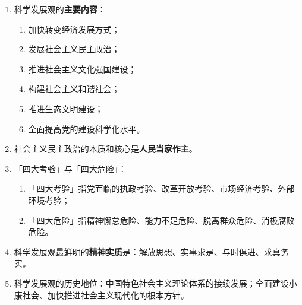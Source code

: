 \documentclass[UTF8]{ctexart}
\newcommand\Emph[2]{\colorbox{c#1-light}{\textcolor{c#1-emph}{\textbf{#2}}}}
\begin{document}
\begin{enumerate}[start=12]
  \item 科学发展观的\Emph{8}{主要内容}：
  \begin{enumerate}[label={\roman{enumii})}, start=1]
    \item 加快转变经济发展方式；
    \item 发展社会主义民主政治；
    \item 推进社会主义文化强国建设；
    \item 构建社会主义和谐社会；
    \item 推进生态文明建设；
    \item 全面提高党的建设科学化水平。
  \end{enumerate}
  \item 社会主义民主政治的本质和核心是\Emph{8}{人民当家作主}。
  \item 「四大考验」与「四大危险」：
  \begin{enumerate}[label={\roman{enumii})}, start=1]
    \item 「四大考验」指党面临的执政考验、改革开放考验、市场经济考验、外部环境考验；
    \item 「四大危险」指精神懈怠危险、能力不足危险、脱离群众危险、消极腐败危险。
  \end{enumerate}
  \item 科学发展观最鲜明的\Emph{8}{精神实质}是：解放思想、实事求是、与时俱进、求真务实。
  \item 科学发展观的历史地位：中国特色社会主义理论体系的接续发展；全面建设小康社会、加快推进社会主义现代化的根本方针。
\end{enumerate}
\end{document}
